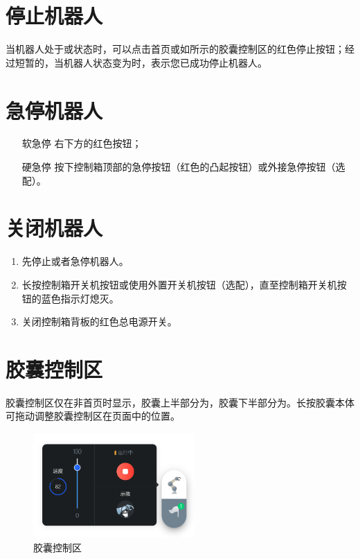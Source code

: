 \section{停止机器人}
当机器人处于或状态时，可以点击首页或如所示的胶囊控制区的红色停止按钮；经过短暂的，当机器人状态变为时，表示您已成功停止机器人。


\section{急停机器人}

\begin{itemize}[leftmargin=3.5em]
	\item[软急停] \LM 右下方的红色按钮；
	\item[硬急停] 按下控制箱顶部的急停按钮（红色的凸起按钮）或外接急停按钮（选配）。
\end{itemize}


\section{关闭机器人}
\begin{enumerate}
	\item 先停止或者急停机器人。
	\item 长按控制箱开关机按钮或使用外置开关机按钮（选配），直至控制箱开关机按钮的蓝色指示灯熄灭。
	\item 关闭控制箱背板的红色总电源开关。
\end{enumerate}


\section{胶囊控制区}
胶囊控制区仅在非首页时显示，胶囊上半部分为，胶囊下半部分为。长按胶囊本体可拖动调整胶囊控制区在页面中的位置。

\begin{figure}[hb]
	\centering
	\includegraphics[height=4cm]{screen/2-18.png}
	\caption{胶囊控制区}
	\label{fig:胶囊控制区}
\end{figure}


